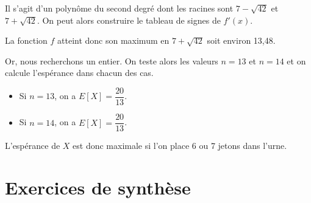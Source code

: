 \documentclass[11pt,fleqn, openany]{book} %
\begin{document}
\begin{solution}
Il s'agit d'un polynôme du second degré dont les racines sont $7-\sqrt{42}$ et $7+\sqrt{42}$. On peut alors construire le tableau de signes de $f'(x)$.

\begin{center}
\end{center}

La fonction $f$ atteint donc son maximum en $7+\sqrt{42}$ soit environ 13,48.

Or, nous recherchons un entier. On teste alors les valeurs $n=13$ et $n=14$ et on calcule l'espérance dans chacun des cas.
\begin{itemize}
\item Si $n=13$, on a $E[X]= \dfrac{20}{13}$.
\item Si $n=14$, on a $E[X]=\dfrac{20}{13}$.
\end{itemize}

L'espérance de $X$ est donc maximale si l'on place 6 ou 7 jetons dans l'urne.

\end{solution}



\section*{Exercices de synthèse}
\end{document}
